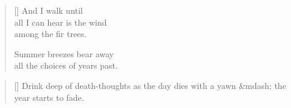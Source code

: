   \newpage

  \begin{verse}[\textwidth]
    And I walk until\\
    all I can hear is the wind\\
    among the fir trees.

    \vin Summer breezes bear away\\
    \vin all the choices of years past.
  \end{verse}

  \newpage

  \begin{verse}[\textwidth]
      Drink deep of death-thoughts
      as the day dies with a yawn &mdash;
      the year starts to fade.
  \end{verse}
